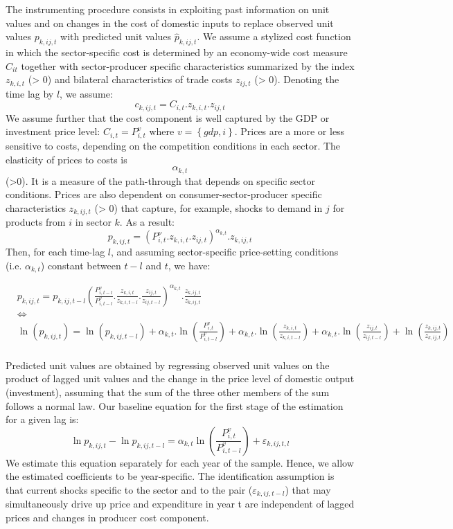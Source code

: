 \documentclass[12pt,twoside,a4paper,notitlepage]{article}
\begin{document}
{The instrumenting procedure consists in exploiting past information on unit values and on changes in the cost of domestic inputs to replace observed unit values ${{p}_{k,ij,t}}$ with predicted unit values ${{\hat{p}}_{k,ij,t}}$.
We assume a stylized cost function in which the sector-specific cost is determined by an economy-wide cost measure ${{C}_{it}}$ together with sector-producer specific characteristics summarized by the index ${{z}_{k,i,t}}$ (> 0) and bilateral characteristics of trade costs ${{z}_{ij,t}}$ (> 0). Denoting the time lag by $l$, we assume:
\[{{c}_{k,ij,t}}={{C}_{i,t}}.{{z}_{k,i,t}}.{{z}_{ij,t}}\] 
We assume further that the cost component is well captured by the GDP or investment price level: ${{C}_{i,t}}=P_{i,t}^{v}$ where $v=\left\{ gdp,i \right\}$. Prices are a more or less sensitive to costs, depending on the competition conditions in each sector. The elasticity of prices to costs is \[{{\alpha }_{k,t}}\] (>0). It is a measure of the path-through that depends on specific sector conditions. Prices are also dependent on consumer-sector-producer specific characteristics ${{z}_{k,ij,t}}$ (> 0) that capture, for example, shocks to demand in $j$ for products from $i$ in sector $k$. As a result:
\[{{p}_{k,ij,t}}={{\left( P_{i,t}^{\nu }.{{z}_{k,i,t}}.{{z}_{ij,t}} \right)}^{{{\alpha }_{k,t}}}}.{{z}_{k,ij,t}}\]
 Then, for each time-lag $l$, and assuming sector-specific price-setting conditions (i.e. ${{\alpha }_{k,t}}$) constant between $t-l$ and $t$, we have:

\begin{align}
  & {{p}_{k,ij,t}}={{p}_{k,ij,t-l}}{{\left( \frac{P_{i,t-l}^{v}}{P_{i,t-l}^{v}}.\frac{{{z}_{k,i,t}}}{{{z}_{k,i,t-l}}}.\frac{{{z}_{ij,t}}}{{{z}_{ij,t-l}}} \right)}^{{{\alpha }_{k,t}}}}.\frac{{{z}_{k,ij,t}}}{{{z}_{k,ij,t}}} \\ 
 & \Leftrightarrow  \\ 
 & \ln \left( {{p}_{k,ij,t}} \right)=\ln \left( {{p}_{k,ij,t-l}} \right)+{{\alpha }_{k,t}}.\ln \left( \frac{P_{i,t}^{v}}{P_{i,t-l}^{v}} \right)+{{\alpha }_{k,t}}.\ln \left( \frac{{{z}_{k,i,t}}}{{{z}_{k,i,t-l}}} \right)+{{\alpha }_{k,t}}.\ln \left( \frac{{{z}_{ij,t}}}{{{z}_{ij,t-l}}} \right)+\ln \left( \frac{{{z}_{k,ij,t}}}{{{z}_{k,ij,t}}} \right) \\ 
\end{align}

Predicted unit values are obtained by regressing observed unit values on the product of lagged unit values and the change in the price level of domestic output (investment), assuming that the sum of the three other members of the sum follows a normal law. Our baseline equation for the first stage of the estimation for a given lag is: 
	\[\ln {{p}_{k,ij,t}}-\ln {{p}_{k,ij,t-l}}={{\alpha }_{k,t}}\ln \left( \frac{P_{i,t}^{v}}{P_{i,t-l}^{v}} \right)+{{\varepsilon }_{k,ij,t,l}}\] 	
We estimate this equation separately for each year of the sample. Hence, we allow the estimated coefficients to be year-specific. The identification assumption is that current shocks specific to the sector and to the pair (${{\varepsilon }_{k,ij,t-l}}$) that may simultaneously drive up price and expenditure in year t are independent of lagged prices and changes in producer cost component. 

}
\end{document}
